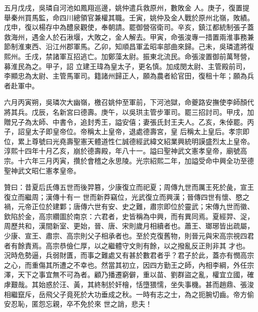 \begin{pinyinscope}
 五月戊戌，吳璘自河池如鳳翔巡邊，姚仲遣兵救原州，數敗金
 人。庚子，復置提舉秦州買馬監，命四川總領官兼權其職。壬寅，姚仲及金人戰於原州北嶺，敗績。戊申，復以楊存中為醴泉觀使，奉朝請。罷御營宿衛司。辛亥，鎮江都統制張子蓋救海州，遇金人於石湫堰，大敗之，金人解去。甲寅，命張浚專一措置兩淮事務兼節制淮東西、沿江州郡軍馬。乙卯，知順昌軍孟昭率部曲來歸。己未，吳璘遣將復熙州。壬戌，禁諸軍互招逃亡。加鄭藻太尉。振東北流民。命張浚置御前萬弩營，募淮民為之。甲子，詔
 立建王瑋為皇太子，更名慎。加成閔太尉、主管殿前司，李顯忠為太尉、主管馬軍司。籍諸州歸正人，願為農者給官田，復租十年；願為兵者赴軍中。



 六月丙寅朔，吳璘次大幽嶺，檄召姚仲至軍前，下河池獄，命夔路安撫使李師顏代將其兵。戊辰，名新宮曰德壽。庚午，以吳珙主管步軍司。罷三招討司。甲戌，加贈兄子為太師、中書令，追封秀王，謚安僖；妻張氏封王夫人。乙亥，朱倬罷。丙子，詔皇太子即皇帝位。帝稱太上皇帝，退處德壽宮，皇
 后稱太上皇后。孝宗即位，累上尊號曰光堯壽聖憲天體道性仁誠德經武緯文紹業興統明謨盛烈太上皇帝。淳熙十四年十月乙亥，崩於德壽殿，年八十一。謚曰聖神武文憲孝皇帝，廟號高宗。十六年三月丙寅，攢於會稽之永思陵。光宗紹熙二年，加謚受命中興全功至德聖神武文昭仁憲孝皇帝。



 贊曰：昔夏后氏傳五世而後羿篡，少康復立而祀夏；周傳九世而厲王死於彘，宣王復立而繼周；漢傳十有一
 世而新莽竊位，光武復立而興漢；晉傳四世有懷、愍之禍，元帝正位於建鄴；唐傳六世有安、史之難，肅宗即位於靈武；宋傳九世而徽、欽陷於金，高宗纘圖於南京：六君者，史皆稱為中興，而有異同焉。夏經羿、浞，周歷共和，漢間新室、更始，晉、唐、宋則歲月相續者也。蕭王、瑯琊皆出疏屬，少康、宣王、肅宗、高宗則父子相承者也。至於克復舊物，則晉元與宋高宗視四君者有餘責焉。高宗恭儉仁厚，以之繼體守文則有餘，以之撥亂反正則非其
 才也。況時危勢逼，兵弱財匱，而事之難處又有甚於數君者乎？君子於此，蓋亦有憫高宗之心，而重傷其所遭之不幸也。然當其初立，因四方勤王之師，內相李綱，外任宗澤，天下之事宜無不可為者。顧乃播遷窮僻，重以苗、劉群盜之亂，權宜立國，確虖艱哉。其始惑於汪、黃，其終制於奸檜，恬墮猥懦，坐失事機。甚而趙鼎、張浚相繼竄斥，岳飛父子竟死於大功垂成之秋。一時有志之士，為之扼腕切齒。帝方偷安忍恥，匿怨忘親，卒不免於來
 世之誚，悲夫！



\end{pinyinscope}